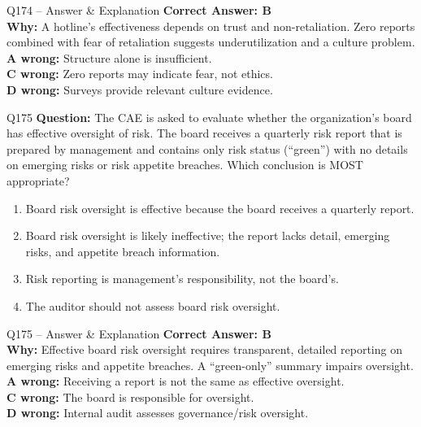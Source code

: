 \documentclass[aspectratio=169,10pt]{beamer}
\begin{document}
	\begin{frame}[t]{Q174 -- Answer \& Explanation}
		\small
		\textbf{Correct Answer: B} \\[4pt]
		\textbf{Why:} A hotline's effectiveness depends on trust and non-retaliation. Zero reports combined with fear of retaliation suggests underutilization and a culture problem. \\[4pt]
		\textbf{A wrong:} Structure alone is insufficient. \\[2pt]
		\textbf{C wrong:} Zero reports may indicate fear, not ethics. \\[2pt]
		\textbf{D wrong:} Surveys provide relevant culture evidence.
	\end{frame}
	
	\begin{frame}[t]{Q175}
		\small
		\textbf{Question:} The CAE is asked to evaluate whether the organization's board has effective oversight of risk. The board receives a quarterly risk report that is prepared by management and contains only risk status (``green'') with no details on emerging risks or risk appetite breaches. Which conclusion is MOST appropriate?
		\begin{enumerate}[label=\Alph*.,itemsep=1pt,topsep=2pt]
			\item Board risk oversight is effective because the board receives a quarterly report.
			\item Board risk oversight is likely ineffective; the report lacks detail, emerging risks, and appetite breach information.
			\item Risk reporting is management's responsibility, not the board's.
			\item The auditor should not assess board risk oversight.
		\end{enumerate}
	\end{frame}
	
	\begin{frame}[t]{Q175 -- Answer \& Explanation}
		\small
		\textbf{Correct Answer: B} \\[4pt]
		\textbf{Why:} Effective board risk oversight requires transparent, detailed reporting on emerging risks and appetite breaches. A ``green-only'' summary impairs oversight. \\[4pt]
		\textbf{A wrong:} Receiving a report is not the same as effective oversight. \\[2pt]
		\textbf{C wrong:} The board is responsible for oversight. \\[2pt]
		\textbf{D wrong:} Internal audit assesses governance/risk oversight.
	\end{frame}
	
\end{document}
